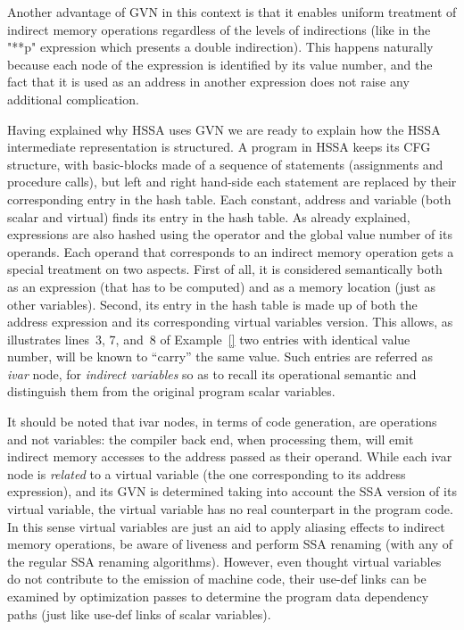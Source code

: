 Another advantage of GVN in this context is that it enables uniform treatment of indirect memory operations regardless of the levels of indirections (like in the "**p" expression which presents a double indirection).
This happens naturally because each node of the expression is identified by its value number, and the fact that it is used as an address in another expression does not raise any additional complication.

Having explained why HSSA uses GVN we are ready to explain how the HSSA intermediate representation is structured.
A program in HSSA keeps its CFG structure, with basic-blocks made of a sequence of statements (assignments and procedure calls), but left and right hand-side each statement are replaced by their corresponding entry in the hash table. 
Each constant, address and variable (both scalar and virtual) finds its entry in the hash table.
As already explained, expressions are also hashed using the operator and the global value number of its operands.
Each operand that corresponds to an indirect memory operation gets a special treatment on two aspects.
First of all, it is considered semantically both as an expression (that has to be computed) and as a memory location (just as other variables).
Second, its entry in the hash table is made up of both the address expression and its corresponding virtual variables version.
This allows, as illustrates lines~3, 7, and~8 of Example~\ref{} two entries with identical value number, will be known to ``carry'' the same value.
Such entries are referred as \emph{ivar} node, for \emph{indirect variables} so as to recall its operational semantic and distinguish them from the original program scalar variables. 

It should be noted that ivar nodes, in terms of code generation, are operations and not variables: the compiler back end, when processing them, will emit indirect memory accesses to the address passed as their operand.
While each ivar node is \emph{related} to a virtual variable (the one corresponding to its address expression), and its GVN is determined taking into account the SSA version of its virtual variable, the virtual variable has no real counterpart in the program code.
In this sense virtual variables are just an aid to apply aliasing effects to indirect memory operations, be aware of liveness and perform SSA renaming (with any of the regular SSA renaming algorithms).
However, even thought virtual variables do not contribute to the emission of machine code, their use-def links can be examined by optimization passes to determine the program data dependency paths (just like use-def links of scalar variables).

